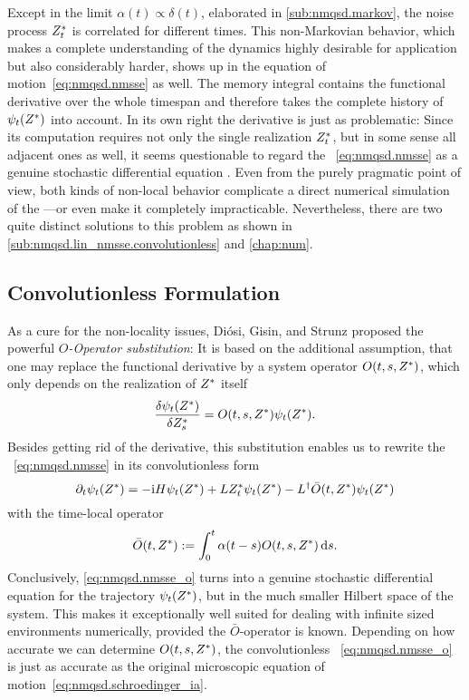 Except in the limit $\alpha(t) \propto \delta(t)$, elaborated in \autoref{sub:nmqsd.markov}, the noise process ${Z}^*_t$ is correlated for different times.
This non-Markovian behavior, which makes a complete understanding of the dynamics highly desirable for application but also considerably harder, shows up in the equation of motion~\ref{eq:nmqsd.nmsse} as well.
The memory integral contains the functional derivative over the whole timespan and therefore takes the complete history of $\psitZ$ into account.
In its own right the derivative is just as problematic:
Since its computation requires not only the single realization ${Z}^*_t$, but in some sense all adjacent ones as well, it seems questionable to regard the \NMSSE~\ref{eq:nmqsd.nmsse} as a genuine stochastic differential equation \cite{GaWi02_real_nmsse}.
Even from the purely pragmatic point of view, both kinds of non-local behavior complicate a direct numerical simulation of the \NMSSE---or even make it completely impracticable.
Nevertheless, there are two quite distinct solutions to this problem as shown in \autoref{sub:nmqsd.lin_nmsse.convolutionless} and \autoref{chap:num}.


\subsection{Convolutionless Formulation}
\label{sub:nmqsd.lin_nmsse.convolutionless}

As a cure for the non-locality issues, Diósi, Gisin, and Strunz \cite{DiGiSt98_nmqsd} proposed the powerful \emph{$O$-Operator substitution}:
It is based on the additional assumption, that one may replace the functional derivative by a system operator $O(t,s,{Z}^*)$, which only depends on the realization of ${Z}^*$ itself
\begin{equation}
  \frac{\delta \psi_t({Z}^*)}{\delta {Z}^*_s} = O(t, s, {Z}^*) \psi_t({Z}^*).
  \label{eq:nmqsd.o_substition}
\end{equation}
Besides getting rid of the derivative, this substitution enables us to rewrite the \NMSSE~\ref{eq:nmqsd.nmsse} in its convolutionless form
\begin{equation}
  \partial_t \psi_t({Z}^*) = -\mathrm{i}H\psi_t({Z}^*)  +  L{Z}^*_t\psi_t({Z}^*)  -  L^\dagger \bar O(t, {Z}^*) \psi_t({Z}^*)
  \label{eq:nmqsd.nmsse_o}
\end{equation}
with the time-local operator
\begin{equation}
  \bar O(t, {Z}^*) := \int_0^t \alpha(t - s) O(t, s, {Z}^*) \, \mathrm{d} s.
  \label{eq:nmqsd.o_bar}
\end{equation}
Conclusively, \autoref{eq:nmqsd.nmsse_o} turns into a genuine stochastic differential equation for the trajectory $\psi_t({Z}^*)$, but in the much smaller Hilbert space of the system.
This makes it exceptionally well suited for dealing with infinite sized environments numerically, provided the $\bar O$-operator is known.
Depending on how accurate we can determine $O(t,s,{Z}^*)$, the convolutionless \NMSSE~\ref{eq:nmqsd.nmsse_o} is just as accurate as the original microscopic equation of motion~\ref{eq:nmqsd.schroedinger_ia}.

